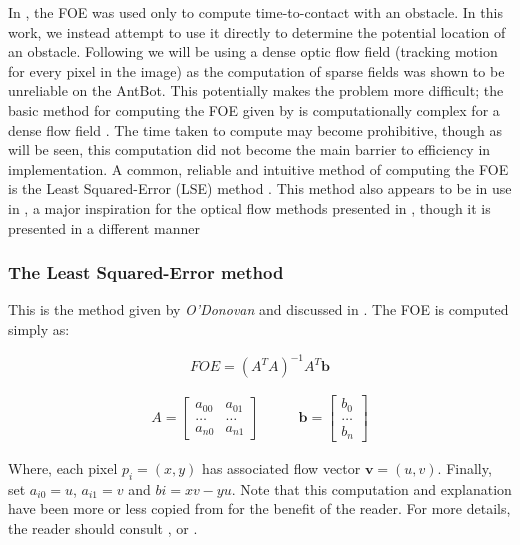 \documentclass[a4paper,11pt,twoside,openright]{article}
\begin{document}
In \cite{Mitchell2018}, the FOE was used only to compute
time-to-contact with an obstacle. In this work, we instead attempt to
use it directly to determine the potential location of an
obstacle. Following \cite{Mitchell2018} we will be using a dense optic
flow field (tracking motion for every pixel in the image) as the
computation of sparse fields was shown to be unreliable on the
AntBot. This potentially makes the problem more difficult; the basic
method for computing the FOE given by \cite{ODonovan2005} is
computationally complex for a dense flow field
\cite{Mitchell2018}. The time taken to compute may become prohibitive,
though as will be seen, this computation did not become the main
barrier to efficiency in implementation. A common, reliable and
intuitive method of computing the FOE is the Least Squared-Error (LSE)
method \cite{Tistarelli1991, ODonovan2005, Vanderstap2012}. This
method also appears to be in use in \cite{Souhila2007}, a major
inspiration for the optical flow methods presented in
\cite{Mitchell2018}, though it is presented in a different manner

\subsubsection{The Least Squared-Error method}
This is the method given by \textit{O'Donovan} and discussed in
\cite{Mitchell2018}. The FOE is computed simply as:

\begin{equation}
  \label{eq:foe}
  FOE = (A^TA)^{-1}A^T\mathbf{b}
\end{equation}

\begin{equation*}
  \begin{split}
 A =
\begin{bmatrix}
  a_{00} & a_{01}\\
  \dots  & \dots \\
  a_{n0} &  a_{n1}
\end{bmatrix}
\qquad
\end{split}
\begin{split}
\mathbf{b} =
\begin{bmatrix}
  b_0 \\
  \dots \\
  b_n
\end{bmatrix}
\end{split}
\end{equation*}
\newline

Where, each pixel $p_i = (x, y)$ has associated flow vector $\mathbf{v} = (u,v)$.
Finally, set $a_{i0} = u$, $a_{i1} = v$ and $b{i} = xv - yu$. Note that this
computation and explanation have been more or less copied from
\cite{Mitchell2018} for the benefit of the reader. For more details, the reader
should consult \cite{Mitchell2018}, or \cite{ODonovan2005}.
\newline
\par
\end{document}
